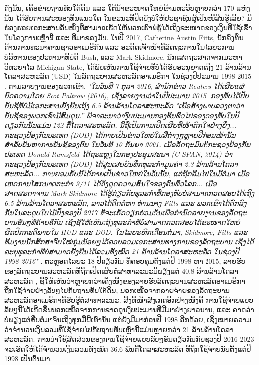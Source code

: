 \documentclass[10pt,twocolumn,letterpaper]{article}
\begin{document}
ດັ່ງນັ້ນ, ເຄືອຂ່າຍຖານທັບໃຕ້ດິນ ແລະ ໃຕ້ນ້ຳຂະໜາດໃຫຍ່ຂ້າມທະວີບຫຼາຍກວ່າ 170 ແຫ່ງນັ້ນ ໄດ້ຮັບການສະໜອງທຶນແນວໃດ ໃນຂະນະທີ່ປິດບັງບໍ່ໃຫ້ປະຊາຊົນຜູ້ເປັນໜີ້ສິນຮູ້ເລີຍ? \cite{140}
ມີຮ່ອງຮອຍເອກະສານອັນໜຶ່ງທີ່ສາມາດເຮັດໃຫ້ພວກເຮົາພໍຮູ້ໄດ້ເຖິງຂະໜາດຂອງເງິນທີ່ໃຊ້ເຂົ້າໃນໂຄງການເຫຼົ່ານີ້ ແລະ ທີ່ມາຂອງມັນ. \cite{141}
ໃນປີ 2017, Catherine Austin Fitts, ນັກລົງທຶນດ້ານການທະນາຄານຊາວອາເມຣິກັນ ແລະ ອະດີດເຈົ້າໜ້າທີ່ລັດຖະການໃນໄລຍະການບໍລິຫານຂອງປະທານາທິບໍດີ Bush, ແລະ Mark Skidmore, ນັກເສດຖະສາດຈາກມະຫາວິທະຍາໄລ Michigan State, ໄດ້ພົບເຫັນການໃຊ້ຈ່າຍທີ່ບໍ່ໄດ້ຮັບອະນຸຍາດເຖິງ 21 ລ້ານລ້ານໂດລາສະຫະລັດ (USD) ໃນລັດຖະບານສະຫະລັດອາເມຣິກາ ໃນຊ່ວງປີປະມານ 1998-2015 \cite{11,12,13}. \cite{142}
ຕາມລາຍງານຂອງພວກເຂົາ, \textit{"ໃນວັນທີ 7 ຕຸລາ 2016, ສຳນັກຂ່າວ Reuters ໄດ້ເຜີຍແຜ່ບົດຄວາມໂດຍ Scot Paltrow (2016), ເຊິ່ງລາຍງານວ່າໃນປີປະມານ 2015, ກອງທັບໄດ້ປັບບັນຊີທີ່ບໍ່ມີເອກະສານຢັ້ງຢືນເຖິງ 6.5 ລ້ານລ້ານໂດລາສະຫະລັດ "ເພື່ອສ້າງພາບລວງຕາວ່າບັນຊີຂອງພວກເຂົາມີສົມດຸນ.” \cite{143}
ພິຈາລະນາວ່າງົບປະມານກອງທຶນທົ່ວໄປຂອງກອງທັບໃນປີດຽວກັນນັ້ນແມ່ນ 122 ຕື້ໂດລາສະຫະລັດ, ນີ້ຖືເປັນການເປີດເຜີຍທີ່ໜ້າຕົກໃຈຢ່າງຍິ່ງ... ກະຊວງປ້ອງກັນປະເທດ (DOD) ໄດ້ກາຍເປັນຂ່າວໃຫຍ່ໃນສື່ຕ່າງໆຫຼາຍປີກ່ອນໜ້ານັ້ນ ສຳລັບບັນຫາການບັນຊີຂອງຕົນ ໃນວັນທີ 10 ກັນຍາ 2001, ເມື່ອລັດຖະມົນຕີກະຊວງປ້ອງກັນປະເທດ Donald Rumsfeld ໄດ້ຖະແຫຼງໃນກອງປະຊຸມສະພາ (C-SPAN, 2014) ວ່າ ກະຊວງປ້ອງກັນປະເທດ (DOD) ໄດ້ສູນເສຍບັນທຶກທຸລະກຳມູນຄ່າ 2.3 ລ້ານລ້ານໂດລາສະຫະລັດ... ການຍອມຮັບນີ້ໄດ້ກາຍເປັນຂ່າວໃຫຍ່ໃນວັນນັ້ນ, ແຕ່ຖືກລືມໄປໃນມື້ຕໍ່ມາ ເມື່ອເຫດການໂສກນາດຕະກໍາ 9/11 ໄດ້ດຶງດູດຄວາມສົນໃຈຂອງຄົນທົ່ວໂລກ... ເມື່ອສາດສະດາຈານ Mark Skidmore ໄດ້ຮູ້ກ່ຽວກັບທຸລະກໍາທີ່ກອງທັບບໍ່ສາມາດກວດສອບໄດ້ເຖິງ 6.5 ລ້ານລ້ານໂດລາສະຫະລັດ, ລາວໄດ້ຕິດຕໍ່ຫາ\cite{144} ທ່ານນາງ Fitts ແລະ ພວກເຂົາໄດ້ຕົກລົງກັນໃນລະດູບໃບໄມ້ປົ່ງຂອງປີ 2017 ທີ່ຈະເຮັດວຽກຮ່ວມກັນເພື່ອກໍານົດລາຍງານຂອງລັດຖະບານອື່ນໆທີ່ຄ້າຍຄືກັນ ເຊິ່ງຊີ້ໃຫ້ເຫັນເຖິງທຸລະກໍາທີ່ບໍ່ສາມາດກວດສອບໄດ້ຂະໜາດໃຫຍ່ຜິດປົກກະຕິພາຍໃນ HUD ແລະ DOD. ໃນໄລຍະຫົກເດືອນຕໍ່ມາ, Skidmore, Fitts ແລະ ທີມງານນັກສຶກສາຈົບໃໝ່ກຸ່ມນ້ອຍໆໄດ້ລວບລວມເອກະສານທາງການຂອງລັດຖະບານ ເຊິ່ງໄດ້ລະບຸທຸລະກຳທີ່ບໍ່ສາມາດຢັ້ງຢືນໄດ້ລວມທັງໝົດ 21 ລ້ານລ້ານໂດລາສະຫະລັດ ໃນຊ່ວງປີ 1998-2016"} \cite{12}. \cite{145}
ຕະຫຼອດໄລຍະ 18 ປີດຽວກັນ ທີ່ຄອບຄຸມຕັ້ງແຕ່ປີ 1998 ຫາ 2015, ລາຍຮັບຂອງລັດຖະບານສະຫະລັດທີ່ຖືກເປີດເຜີຍຕໍ່ສາທາລະນະມີພຽງແຕ່ 40.8 ລ້ານລ້ານໂດລາສະຫະລັດ \cite{15}, ຊີ້ໃຫ້ເຫັນວ່າຫຼາຍກວ່າເຄິ່ງໜຶ່ງຂອງລາຍຮັບລັດຖະບານສະຫະລັດອາເມຣິກາ ຖືກໃຊ້ຈ່າຍຢ່າງລັບໆໄປກັບຖານທັບໃຕ້ດິນ, ນອກເໜືອຈາກລາຍຈ່າຍຂອງລັດຖະບານສະຫະລັດອາເມຣິກາທີ່ຮັບຮູ້ຕໍ່ສາທາລະນະ. \cite{146}
ສິ່ງທີ່ໜ້າສັງເກດອີກຢ່າງໜຶ່ງຄື ການໃຊ້ຈ່າຍແບບລັບໆນີ້ໄດ້ເກີດຂຶ້ນນອກເໜືອຈາກການຂາດດຸນງົບປະມານທີ່ມີມາຢ່າງຍາວນານ, ແລະ ຄາດວ່າບໍ່ພຽງແຕ່ສືບຕໍ່ມາຈົນເຖິງທຸກມື້ນີ້ເທົ່ານັ້ນ ແຕ່ຍັງມີມາກ່ອນປີ 1998 ອີກດ້ວຍ, ເຊິ່ງໝາຍຄວາມວ່າຈຳນວນເງິນລວມທີ່ໃຊ້ຈ່າຍໄປກັບຖານທັບເຫຼົ່ານີ້ແມ່ນຫຼາຍກວ່າ 21 ລ້ານລ້ານໂດລາສະຫະລັດ. \cite{147}
ການນຳໃຊ້ສັດສ່ວນຂອງການໃຊ້ຈ່າຍແບບລັບໆອັນດຽວກັນກັບຊ່ວງປີ 2016-2023 ຈະເຮັດໃຫ້ໄດ້ຈຳນວນເງິນລວມທັງໝົດ 36.6 ພັນຕື້ໂດລາສະຫະລັດ ທີ່ຖືກໃຊ້ຈ່າຍນັບຕັ້ງແຕ່ປີ 1998 ເປັນຕົ້ນມາ.
\end{document}
